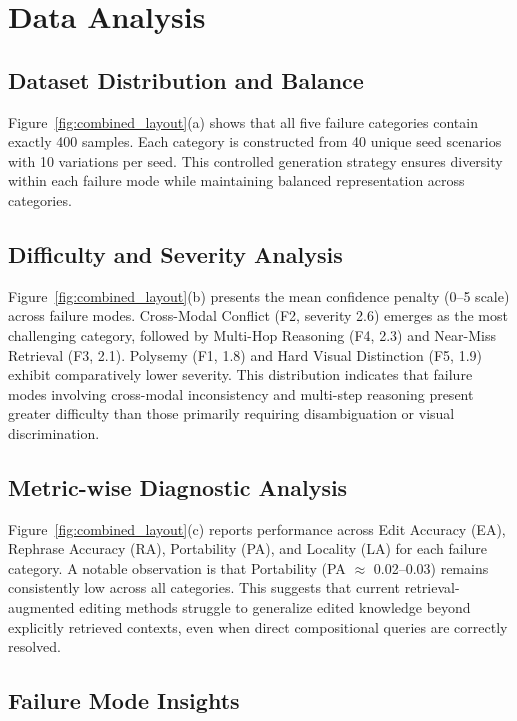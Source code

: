 \documentclass{article}
\begin{document}
\section{Data Analysis}
\label{sec:data_analysis}

\subsection{Dataset Distribution and Balance}

Figure~\ref{fig:combined_layout}(a) shows that all five failure categories contain exactly 400 samples. Each category is constructed from 40 unique seed scenarios with 10 variations per seed. This controlled generation strategy ensures diversity within each failure mode while maintaining balanced representation across categories.

\subsection{Difficulty and Severity Analysis}

Figure~\ref{fig:combined_layout}(b) presents the mean confidence penalty (0--5 scale) across failure modes. Cross-Modal Conflict (F2, severity 2.6) emerges as the most challenging category, followed by Multi-Hop Reasoning (F4, 2.3) and Near-Miss Retrieval (F3, 2.1). Polysemy (F1, 1.8) and Hard Visual Distinction (F5, 1.9) exhibit comparatively lower severity. This distribution indicates that failure modes involving cross-modal inconsistency and multi-step reasoning present greater difficulty than those primarily requiring disambiguation or visual discrimination.

\subsection{Metric-wise Diagnostic Analysis}

Figure~\ref{fig:combined_layout}(c) reports performance across Edit Accuracy (EA), Rephrase Accuracy (RA), Portability (PA), and Locality (LA) for each failure category. A notable observation is that Portability (PA $\approx$ 0.02--0.03) remains consistently low across all categories. This suggests that current retrieval-augmented editing methods struggle to generalize edited knowledge beyond explicitly retrieved contexts, even when direct compositional queries are correctly resolved.

\subsection{Failure Mode Insights}
\end{document}
